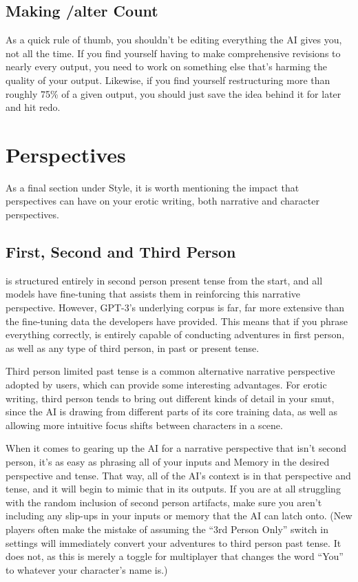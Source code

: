﻿\documentclass[Coomer-main.tex]{subfiles}
\begin{document}
\subsection{Making /alter Count}

As a quick rule of thumb, you shouldn't be editing everything the AI gives you, not all the time.
If you find yourself having to make comprehensive revisions to nearly every output, you need to work on something else that's harming the quality of your output.
Likewise, if you find yourself restructuring more than roughly 75\% of a given output, you should just save the idea behind it for later and hit redo.

\section{Perspectives}

As a final section under Style, it is worth mentioning the impact that perspectives can have on your erotic writing, both narrative and character perspectives.

\subsection{First, Second and Third Person}

\aid is structured entirely in second person present tense from the start, and all models have fine-tuning that assists them in reinforcing this narrative perspective.
However, GPT-3's underlying corpus is far, far more extensive than the fine-tuning data the developers have provided.
This means that if you phrase everything correctly, \aid is entirely capable of conducting adventures in first person, as well as any type of third person, in past or present tense.

Third person limited past tense is a common alternative narrative perspective adopted by \aid users, which can provide some interesting advantages.
For erotic writing, third person tends to bring out different kinds of detail in your smut, since the AI is drawing from different parts of its core training data, as well as allowing more intuitive focus shifts between characters in a scene.

When it comes to gearing up the AI for a narrative perspective that isn't second person, it's as easy as phrasing all of your inputs and Memory in the desired perspective and tense.
That way, all of the AI's context is in that perspective and tense, and it will begin to mimic that in its outputs.
If you are at all struggling with the random inclusion of second person artifacts, make sure you aren't including any slip-ups in your inputs or memory that the AI can latch onto. (New players often make the mistake of assuming the “3rd Person Only” switch in settings will immediately convert your adventures to third person past tense.
It does not, as this is merely a toggle for multiplayer that changes the word “You” to whatever your character’s name is.)
\end{document}

